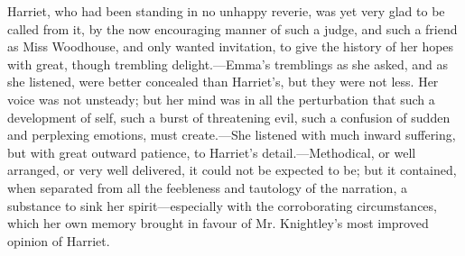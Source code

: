 Harriet, who had been standing in no unhappy reverie, was yet very glad to be called from it, by the now encouraging manner of such a judge, and such a friend as Miss Woodhouse, and only wanted invitation, to give the history of her hopes with great, though trembling delight.---Emma's tremblings as she asked, and as she listened, were better concealed than Harriet's, but they were not less. Her voice was not unsteady; but her mind was in all the perturbation that such a development of self, such a burst of threatening evil, such a confusion of sudden and perplexing emotions, must create.---She listened with much inward suffering, but with great outward patience, to Harriet's detail.---Methodical, or well arranged, or very well delivered, it could not be expected to be; but it contained, when separated from all the feebleness and tautology of the narration, a substance to sink her spirit---especially with the corroborating circumstances, which her own memory brought in favour of Mr. Knightley's most improved opinion of Harriet.

